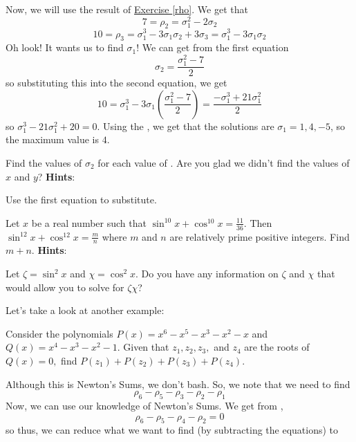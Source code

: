 \documentclass[11pt,titlepage]{scrartcl}
\newenvironment{hint}{\footnotesize \normalfont \textbf{Hints}:}{\hspace{-0.5ex}}
\begin{document}
Now, we will use the result of \hyperlink{rho}{Exercise \ref*{rho}}. We get that
\[7=\rho_2=\sigma_1^2-2\sigma_2\]
\[10=\rho_3=\sigma_1^3-3\sigma_1\sigma_2+3\sigma_3=\sigma_1^3-3\sigma_1\sigma_2\]
Oh look! It wants us to find $\sigma_1$! We can get from the first equation
\[\sigma_2=\dfrac{\sigma_1^2-7}{2}\]
so substituting this into the second equation, we get
\[10=\sigma_1^3-3\sigma_1\left(\frac{\sigma_1^2-7}{2}\right)=\frac{-\sigma_1^3+21\sigma_1^2}{2}\]
so $\sigma_1^3-21\sigma_1^2+20=0$. Using the , we get that the solutions are $\sigma_1=1,4,-5$, so the maximum value is $\boxed{4}.$
\begin{exercisebox}
\begin{exercise}
Find the values of $\sigma_2$ for each value of . Are you glad we didn't find the values of $x$ and $y$?
\begin{hint}
\begin{addhint}{
Use the first equation to substitute.
}\end{addhint}
\end{hint}
\end{exercise}
\begin{exercise}
Let $x$ be a real number such that $\sin^{10}x+\cos^{10} x = \tfrac{11}{36}$. Then $\sin^{12}x+\cos^{12} x = \tfrac{m}{n}$ where $m$ and $n$ are relatively prime positive integers. Find $m+n$.
\begin{hint}
\begin{addhint}{
Let $\zeta=\sin^2 x$ and $\chi=\cos^2 x$. Do you have any information on $\zeta$ and $\chi$ that would allow you to solve for $\zeta\chi$?
}\end{addhint}
\end{hint}
\end{exercise}
\end{exercisebox}
Let's take a look at another example:
\begin{example}
Consider the polynomials $P(x) = x^{6} - x^{5} - x^{3} - x^{2} - x$ and $Q(x) = x^{4} - x^{3} - x^{2} - 1.$ Given that $z_{1},z_{2},z_{3},$ and $z_{4}$ are the roots of $Q(x) = 0,$ find $P(z_{1}) + P(z_{2}) + P(z_{3}) + P(z_{4}).$
\end{example}
Although this is Newton's Sums, we don't bash. So, we note that we need to find
\[\rho_6-\rho_5-\rho_3-\rho_2-\rho_1\]
Now, we can use our knowledge of Newton's Sums. We get from ,
\[\rho_6-\rho_5-\rho_4-\rho_2=0\]
so thus, we can reduce what we want to find (by subtracting the equations) to
\end{document}
